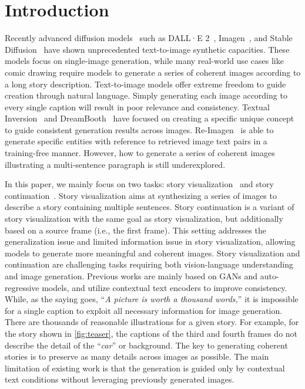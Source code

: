 \documentclass[10pt,twocolumn,letterpaper]{article}
\begin{document}
\section{Introduction}
\label{sec:introduction}
Recently advanced diffusion models~\cite{diffusionmodel} such as DALL·E 2~\cite{dalle2}, Imagen~\cite{imagen}, and Stable Diffusion~\cite{ldm} have shown unprecedented text-to-image synthetic capacities. These models focus on single-image generation, while many real-world use cases like comic drawing require models to generate a series of coherent images according to a long story description. Text-to-image models offer extreme freedom to guide creation through natural language. Simply generating each image according to every single caption will result in poor relevance and consistency. Textual Inversion~\cite{textualinversion} and DreamBooth~\cite{dreambooth} have focused on creating a specific unique concept to guide consistent generation results across images. Re-Imagen~\cite{reimagen} is able to generate specific entities with reference to retrieved image text pairs in a training-free manner. However, how to generate a series of coherent images illustrating a multi-sentence paragraph is still underexplored.

In this paper, we mainly focus on two tasks: story visualization~\cite{storygan} and story continuation~\cite{storydalle}. Story visualization aims at synthesizing a series of images to describe a story containing multiple sentences. Story continuation is a variant of story visualization with the same goal as story visualization, but additionally based on a source frame (i.e., the first frame). This setting addresses the generalization issue and limited information issue in story visualization, allowing models to generate more meaningful and coherent images. Story visualization and continuation are challenging tasks requiring both vision-language understanding and image generation. Previous works are mainly based on GANs and auto-regressive models, and utilize contextual text encoders to improve consistency. While, as the saying goes, ``\textit{A picture is worth a thousand words,}'' it is impossible for a single caption to exploit all necessary information for image generation. There are thousands of reasonable illustrations for a given story. For example, for the story shown in \cref{fig:teaser}, the captions of the third and fourth frames do not describe the detail of the ``\textit{car}'' or background. The key to generating coherent stories is to preserve as many details across images as possible. The main limitation of existing work is that the generation is guided only by contextual text conditions without leveraging previously generated images.
\end{document}
